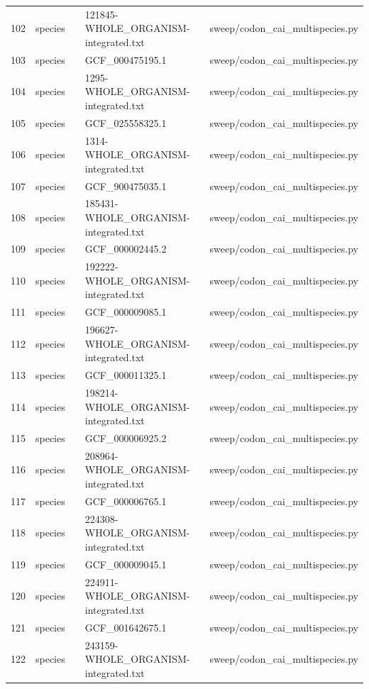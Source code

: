 {\begin{longtable}{rllp{3.2cm}p{4.2cm}}
102 & species &  & 121845-WHOLE\_ORGANISM-integrated.txt & sweep/codon\_cai\_multispecies.py\\
103 & species &  & GCF\_000475195.1 & sweep/codon\_cai\_multispecies.py\\
104 & species &  & 1295-WHOLE\_ORGANISM-integrated.txt & sweep/codon\_cai\_multispecies.py\\
105 & species &  & GCF\_025558325.1 & sweep/codon\_cai\_multispecies.py\\
106 & species &  & 1314-WHOLE\_ORGANISM-integrated.txt & sweep/codon\_cai\_multispecies.py\\
107 & species &  & GCF\_900475035.1 & sweep/codon\_cai\_multispecies.py\\
108 & species &  & 185431-WHOLE\_ORGANISM-integrated.txt & sweep/codon\_cai\_multispecies.py\\
109 & species &  & GCF\_000002445.2 & sweep/codon\_cai\_multispecies.py\\
110 & species &  & 192222-WHOLE\_ORGANISM-integrated.txt & sweep/codon\_cai\_multispecies.py\\
111 & species &  & GCF\_000009085.1 & sweep/codon\_cai\_multispecies.py\\
112 & species &  & 196627-WHOLE\_ORGANISM-integrated.txt & sweep/codon\_cai\_multispecies.py\\
113 & species &  & GCF\_000011325.1 & sweep/codon\_cai\_multispecies.py\\
114 & species &  & 198214-WHOLE\_ORGANISM-integrated.txt & sweep/codon\_cai\_multispecies.py\\
115 & species &  & GCF\_000006925.2 & sweep/codon\_cai\_multispecies.py\\
116 & species &  & 208964-WHOLE\_ORGANISM-integrated.txt & sweep/codon\_cai\_multispecies.py\\
117 & species &  & GCF\_000006765.1 & sweep/codon\_cai\_multispecies.py\\
118 & species &  & 224308-WHOLE\_ORGANISM-integrated.txt & sweep/codon\_cai\_multispecies.py\\
119 & species &  & GCF\_000009045.1 & sweep/codon\_cai\_multispecies.py\\
120 & species &  & 224911-WHOLE\_ORGANISM-integrated.txt & sweep/codon\_cai\_multispecies.py\\
121 & species &  & GCF\_001642675.1 & sweep/codon\_cai\_multispecies.py\\
122 & species &  & 243159-WHOLE\_ORGANISM-integrated.txt & sweep/codon\_cai\_multispecies.py\\

\end{longtable}}
